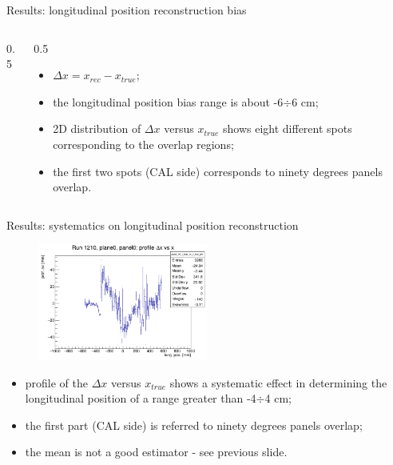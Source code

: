 \documentclass{beamer}[10pt]
\begin{document}
\begin{frame}{Results: longitudinal position reconstruction bias}
\begin{columns}
\begin{column}{0.5\framewidth}
    \end{column}
    \begin{column}{0.5\framewidth}
      \begin{itemize}
       
      \item $\Delta x = x_{rec}-x_{true}$;
      \vspace{3mm}
        \item the longitudinal position bias range is about -6$\div$6 cm;
        \vspace{3mm}
        \item 2D distribution of $\Delta x$ versus $x_{true}$ shows eight different spots corresponding to the overlap regions;
        \vspace{3mm}
        \item the first two spots (CAL side) corresponds to ninety degrees panels overlap.
      \end{itemize}
    \end{column}
  \end{columns}
\end{frame}


\begin{frame}{Results: systematics on longitudinal position reconstruction}

   
    \begin{figure}[H]
      \centering
      \includegraphics[width= 0.5\textwidth]{figures/pdf/panel_00_x_bias_vs_x_prof.png}
      \label{fig:enter-label}
  \end{figure}
   
      \begin{itemize}
      
        
        \item  profile of the $\Delta x$ versus $x_{true}$ shows a systematic effect in determining the longitudinal position of a range greater than -4$\div$4 cm;
        \vspace{3mm}
        \item the first part (CAL side) is referred to ninety degrees panels overlap;
        \vspace{3mm}
        \item the mean is not a good estimator - see previous slide.
      \end{itemize}

  
\end{frame}
\end{document}
